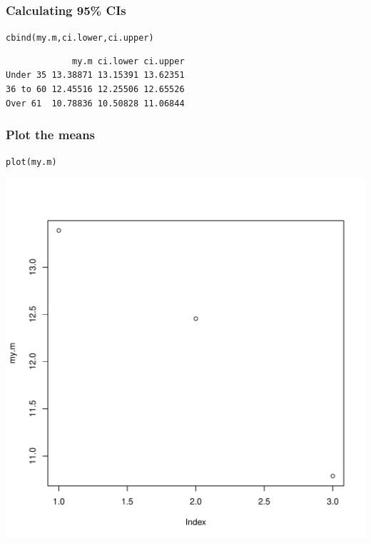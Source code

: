 \documentclass{beamer}\usepackage[]{graphicx}\usepackage[]{color}
\makeatletter
\newcommand{\hlstd}[1]{\textcolor[rgb]{0,0,0}{#1}}%
\newcommand{\hlkwd}[1]{\textcolor[rgb]{0,0.267,0.4}{#1}}%
\newenvironment{kframe}{%
 \def\at@end@of@kframe{}%
 \ifinner\ifhmode%
  \def\at@end@of@kframe{\end{minipage}}%
  \begin{minipage}{\columnwidth}%
 \fi\fi%
 \def\FrameCommand##1{\hskip\@totalleftmargin \hskip-\fboxsep
 \colorbox{shadecolor}{##1}\hskip-\fboxsep
     \hskip-\linewidth \hskip-\@totalleftmargin \hskip\columnwidth}%
 \MakeFramed {\advance\hsize-\width
   \@totalleftmargin\z@ \linewidth\hsize
   \@setminipage}}%
 {\par\unskip\endMakeFramed%
 \at@end@of@kframe}
\newenvironment{knitrout}{}{} %
\makeatother
\begin{document}
\begin{frame}[fragile]
  \frametitle{Calculating 95\% CIs}
\begin{knitrout}
\color{fgcolor}\begin{kframe}
\begin{alltt}
\hlkwd{cbind}\hlstd{(my.m, ci.lower, ci.upper)}
\end{alltt}
\begin{verbatim}
             my.m ci.lower ci.upper
Under 35 13.38871 13.15391 13.62351
36 to 60 12.45516 12.25506 12.65526
Over 61  10.78836 10.50828 11.06844
\end{verbatim}
\end{kframe}
\end{knitrout}
\end{frame}

\begin{frame}[fragile]
  \frametitle{Plot the means}
\begin{knitrout}
\color{fgcolor}\begin{kframe}
\begin{alltt}
\hlkwd{plot}\hlstd{(my.m)}
\end{alltt}
\end{kframe}

{\centering \includegraphics[width=0.6\linewidth]{figure/m1-1} 

}



\end{knitrout}
\end{frame}
\end{document}
